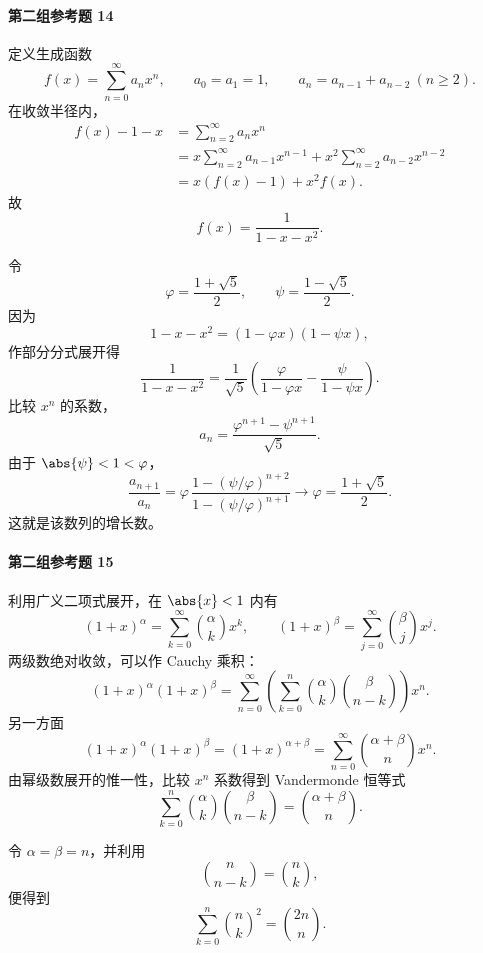 \paragraph{第二组参考题 14}
\begin{xsolution}
定义生成函数
\[
  f(x)=\sum_{n=0}^{\infty}a_nx^n,
  \qquad a_0=a_1=1,
  \qquad a_n=a_{n-1}+a_{n-2}\ (n\geqslant2).
\]
在收敛半径内，
\[
\begin{aligned}
  f(x)-1-x
  &=\sum_{n=2}^{\infty}a_nx^n\\
  &=x\sum_{n=2}^{\infty}a_{n-1}x^{n-1}
   +x^2\sum_{n=2}^{\infty}a_{n-2}x^{n-2}\\
  &=x(f(x)-1)+x^2f(x).
\end{aligned}
\]
故
\[
  \boxed{f(x)=\frac1{1-x-x^2}}.
\]

令
\[
  \varphi=\frac{1+\sqrt5}{2},
  \qquad
  \psi=\frac{1-\sqrt5}{2}.
\]
因为
\[
  1-x-x^2=(1-\varphi x)(1-\psi x),
\]
作部分分式展开得
\[
  \frac1{1-x-x^2}
  =\frac1{\sqrt5}
  \left(\frac{\varphi}{1-\varphi x}
       -\frac{\psi}{1-\psi x}\right).
\]
比较 $x^n$ 的系数，
\[
  \boxed{
  a_n=\frac{\varphi^{n+1}-\psi^{n+1}}{\sqrt5}}.
\]
由于 $\abs{\psi}<1<\varphi$，
\[
  \frac{a_{n+1}}{a_n}
  =\varphi\,
  \frac{1-(\psi/\varphi)^{n+2}}
       {1-(\psi/\varphi)^{n+1}}
  \to\boxed{\varphi=\frac{1+\sqrt5}{2}}.
\]
这就是该数列的增长数。
\end{xsolution}

\paragraph{第二组参考题 15}
\begin{xsolution}
利用广义二项式展开，在 $\abs{x}<1$ 内有
\[
  (1+x)^\alpha
  =\sum_{k=0}^{\infty}{\alpha\choose k}x^k,
  \qquad
  (1+x)^\beta
  =\sum_{j=0}^{\infty}{\beta\choose j}x^j.
\]
两级数绝对收敛，可以作 Cauchy 乘积：
\[
  (1+x)^\alpha(1+x)^\beta
  =\sum_{n=0}^{\infty}
  \left(\sum_{k=0}^{n}{\alpha\choose k}{\beta\choose n-k}\right)x^n.
\]
另一方面
\[
  (1+x)^\alpha(1+x)^\beta=(1+x)^{\alpha+\beta}
  =\sum_{n=0}^{\infty}{\alpha+\beta\choose n}x^n.
\]
由幂级数展开的惟一性，比较 $x^n$ 系数得到 Vandermonde 恒等式
\[
  \boxed{
  \sum_{k=0}^{n}{\alpha\choose k}{\beta\choose n-k}
  ={\alpha+\beta\choose n}}.
\]

令 $\alpha=\beta=n$，并利用
\[
  {n\choose n-k}={n\choose k},
\]
便得到
\[
  \boxed{
  \sum_{k=0}^{n}{n\choose k}^2={2n\choose n}}.
\]
\end{xsolution}

